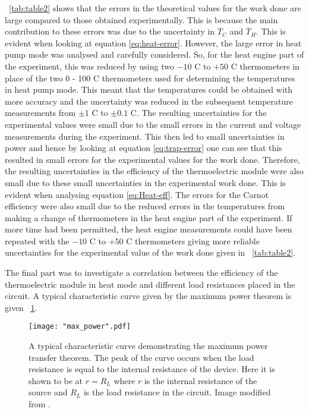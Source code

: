 \documentclass{article}
\newcommand{\figref}[2][\figurename~]{#1\ref{#2}}
\newcommand{\tabref}[2][\tablename~]{#1\ref{#2}}
\begin{document}
\vspace{2mm}
\noindent
\tabref{tab:table2} shows that the errors in the theoretical values for the work done are large compared to those obtained experimentally. This is because the main contribution to these errors was due to the uncertainty in $\overline T_C$ and $\overline T_H$. This is evident when looking at equation  \eqref{eq:heat-error}. However, the large error in heat pump mode was analysed and carefully considered. So, for the heat engine part of the experiment, this was reduced by using two $-10$ C to $+50$ C thermometers in place of the two 0 - 100 C thermometers used for determining the temperatures in heat pump mode. This meant that the temperatures could be obtained with more accuracy and the uncertainty was reduced in the subsequent temperature measurements from $\pm 1$ C to $\pm 0.1$ C. The resulting uncertainties for the experimental values were small due to the small errors in the current and voltage measurements during the experiment. This then led to small uncertainties in power and hence by looking at equation  \eqref{eq:trap-error} one can see that this resulted in small errors for the experimental values for the work done. Therefore, the resulting uncertainties in the efficiency of the thermoelectric module were also small due to these small uncertainties in the experimental work done. This is evident when analysing equation \eqref{eq:Heat-eff}. The errors for the Carnot efficiency were also small due to the reduced errors in the temperatures from making a change of thermometers in the heat engine part of the experiment. If more time had been permitted, the heat engine measurements could have been repeated with the $-10$ C to $+50$ C thermometers giving more reliable uncertainties for the experimental value of the work done given in \tabref{tab:table2}. 

\vspace{2mm}
\noindent
The final part was to investigate a correlation between the efficiency of the thermoelectric module in heat mode and different load resistances placed in the circuit. A typical  characteristic curve given by the maximum power theorem is given \figref{fig:max_power}.

\begin{figure}[h]
\centering
\texttt{[image: "max\_power".pdf]}
\caption{A typical characteristic curve demonstrating the maximum power transfer theorem. The peak of the curve occurs when the load resistance is equal to the internal resistance of the device. Here it is shown to be at $r = R_L$ where $r$ is the internal resistance of the source and $R_L$ is the load resistance in the circuit. Image modified from \cite{Web01}.}
\label{fig:max_power}
\end{figure}
\end{document}
